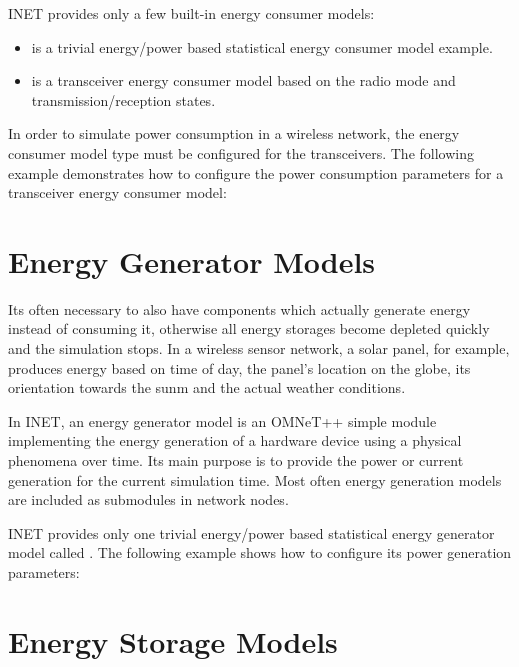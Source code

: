 INET provides only a few built-in energy consumer models:

\begin{itemize}
        \item {} is a trivial energy/power based statistical energy consumer model example.
        \item {} is a transceiver energy consumer model based on the radio mode and transmission/reception states.
\end{itemize}

In order to simulate power consumption in a wireless network, the energy
consumer model type must be configured for the transceivers. The following
example demonstrates how to configure the power consumption parameters for
a transceiver energy consumer model:


\section{Energy Generator Models}

Its often necessary to also have components which actually generate energy
instead of consuming it, otherwise all energy storages become depleted
quickly and the simulation stops. In a wireless sensor network, a solar
panel, for example, produces energy based on time of day, the panel’s
location on the globe, its orientation towards the sunm and the actual
weather conditions.

In INET, an energy generator model is an OMNeT++ simple module implementing
the energy generation of a hardware device using a physical phenomena over
time. Its main purpose is to provide the power or current generation for
the current simulation time. Most often energy generation models are
included as submodules in network nodes.

INET provides only one trivial energy/power based statistical energy
generator model called . The following
example shows how to configure its power generation parameters:


\section{Energy Storage Models}

